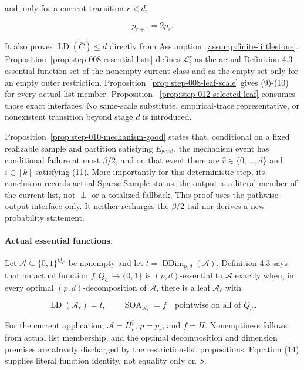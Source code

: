 and, only for a current transition \(r<d\),

\[
 p_{r+1}=2p_r.
\tag{13}
\]

It also proves \(\operatorname{LD}(\bar C)\le d\) directly from
Assumption~\ref{assump:finite-littlestone}. Proposition~\ref{prop:step-008-essential-lists} defines
\(\mathcal L_i^r\) as the actual Definition 4.3 essential-function set of
the nonempty current class and as the empty set only for an empty outer
restriction. Proposition~\ref{prop:step-008-leaf-scale} gives
(9)-(10) for every actual list member. Proposition
~\ref{prop:step-012-selected-leaf} consumes those exact interfaces. No
same-scale substitute, empirical-trace representative, or nonexistent
transition beyond stage \(d\) is introduced.

Proposition~\ref{prop:step-010-mechanism-good} states that,
conditional on a fixed realizable sample and partition satisfying
\(E_{\mathrm{good}}\), the mechanism event has conditional failure at most
\(\beta/2\), and on that event there are
\(\widehat r\in\{0,\ldots,d\}\) and \(i\in[k]\) satisfying (11). More
importantly for this deterministic step, its conclusion records actual
Sparse Sample status: the output is a literal member of the current list,
not \(\perp\) or a totalized fallback. This proof uses the pathwise output
interface only. It neither recharges the \(\beta/2\) tail nor derives a new
probability statement.

\paragraph{Actual essential functions.}

Let \(\mathcal A\subseteq\{0,1\}^{Q_C}\) be nonempty and let
\(t=\operatorname{DDim}_{p,d}(\mathcal A)\). Definition 4.3 says that an
actual function \(f:Q_C\to\{0,1\}\) is \((p,d)\)-essential to
\(\mathcal A\) exactly when, in every optimal
\((p,d)\)-decomposition of \(\mathcal A\), there is a leaf
\(\mathcal A_\ell\) with

\[
 \operatorname{LD}(\mathcal A_\ell)=t,
 \qquad
 \operatorname{SOA}_{\mathcal A_\ell}=f
 \quad\text{pointwise on all of }Q_C.
\tag{14}
\]

For the current application,
\(\mathcal A=H_i^{\widehat r}\), \(p=p_{\widehat r}\), and
\(f=\bar H\). Nonemptiness follows from actual list membership, and the
optimal decomposition and dimension premises are already discharged by the
restriction-list propositions. Equation (14) supplies literal function identity, not
equality only on \(\bar S\).

